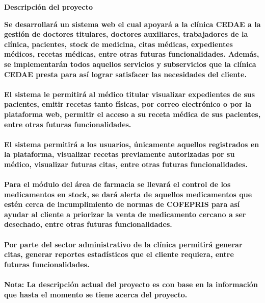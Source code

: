 \documentclass[12pt,letterpaper]{article}
\begin{document}
    \newpage
	\pagestyle{plain}
	{
		\par\vspace{0cm}
		{
			\begin{center}
					\Huge\textbf
					{
						Descripción del proyecto
					}
			\end{center}
        }
        \par\vspace{0cm}
		{
			\normalsize\textbf
			{
                \justify
                Se desarrollará un sistema web el cual apoyará a la clínica CEDAE a la gestión de doctores titulares,
                doctores auxiliares, trabajadores de la clínica, pacientes, stock de medicina, citas médicas, expedientes médicos,
                recetas médicas, entre otras futuras funcionalidades.
                Además, se implementarán todos aquellos servicios y subservicios que la clínica CEDAE presta para así lograr satisfacer
                las necesidades del cliente.
                \\\\
                El sistema le permitirá al médico titular visualizar expedientes de sus pacientes, emitir recetas tanto físicas,
                por correo electrónico o por la plataforma web, permitir el acceso a su receta médica de sus pacientes, entre otras futuras funcionalidades.
                \\\\
                El sistema permitirá a los usuarios, únicamente aquellos registrados en la plataforma, visualizar recetas previamente autorizadas por 
                su médico, visualizar futuras citas, entre otras futuras funcionalidades.
                \\\\
                Para el módulo del área de farmacia se llevará el control de los medicamentos en stock, se dará alerta de aquellos medicamentos que estén cerca de incumplimiento 
                de normas de COFEPRIS para así ayudar al cliente a priorizar la venta de medicamento cercano a ser desechado, entre otras futuras funcionalidades.
                \\\\
                Por parte del sector administrativo de la clínica permitirá generar citas, generar reportes estadísticos que el cliente requiera, entre futuras funcionalidades.
                \\\\
                Nota: La descripción actual del proyecto es con base en la información que hasta el momento se tiene acerca del proyecto.
            }
        }
    }
\end{document}
